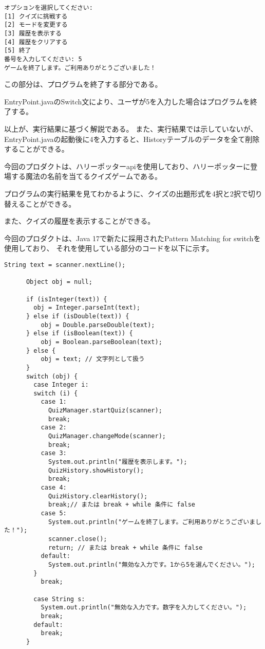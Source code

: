 \documentclass[uplatex,dvipdfmx,a4paper]{jsarticle}
\begin{document}
\begin{lstlisting}[style=result]
オプションを選択してください:
[1] クイズに挑戦する
[2] モードを変更する
[3] 履歴を表示する
[4] 履歴をクリアする
[5] 終了  
番号を入力してください: 5
ゲームを終了します。ご利用ありがとうございました！
\end{lstlisting}
\par この部分は、プログラムを終了する部分である。
\par EntryPoint.javaのSwitch文により、ユーザが5を入力した場合はプログラムを終了する。
\par 以上が、実行結果に基づく解説である。
また、実行結果では示していないが、EntryPoint.javaの起動後に4を入力すると、Historyテーブルのデータを全て削除することができる。
\par 今回のプロダクトは、ハリーポッターapiを使用しており、ハリーポッターに登場する魔法の名前を当てるクイズゲームである。
\par プログラムの実行結果を見てわかるように、クイズの出題形式を4択と2択で切り替えることができる。
\par また、クイズの履歴を表示することができる。
\par 今回のプロダクトは、Java 17で新たに採用されたPattern Matching for switchを使用しており、
それを使用している部分のコードを以下に示す。
\begin{lstlisting}[style=source]
String text = scanner.nextLine();

      Object obj = null;

      if (isInteger(text)) {
        obj = Integer.parseInt(text);
      } else if (isDouble(text)) {
          obj = Double.parseDouble(text);
      } else if (isBoolean(text)) {
          obj = Boolean.parseBoolean(text);
      } else {
          obj = text; // 文字列として扱う
      }
      switch (obj) {
        case Integer i:
        switch (i) {
          case 1:
            QuizManager.startQuiz(scanner);
            break;
          case 2:
            QuizManager.changeMode(scanner);
            break;
          case 3:
            System.out.println("履歴を表示します。");
            QuizHistory.showHistory();
            break;
          case 4:
            QuizHistory.clearHistory();
            break;// または break + while 条件に false
          case 5:
            System.out.println("ゲームを終了します。ご利用ありがとうございました！");
            scanner.close();
            return; // または break + while 条件に false
          default:
            System.out.println("無効な入力です。1から5を選んでください。");
        }
          break;
      
        case String s:
          System.out.println("無効な入力です。数字を入力してください。");
          break;
        default:
          break;
      }
\end{lstlisting}
\end{document}
